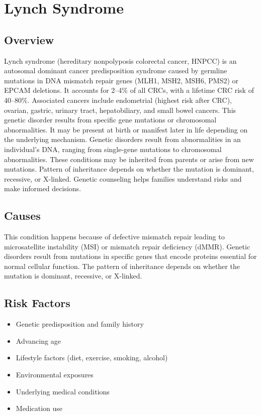 \chapter{Lynch Syndrome}
\label{sec:Lynch Syndrome}

\section{Overview}
Lynch syndrome (hereditary nonpolyposis colorectal cancer, HNPCC) is an autosomal dominant cancer predisposition syndrome caused by germline mutations in DNA mismatch repair genes (MLH1, MSH2, MSH6, PMS2) or EPCAM deletions. It accounts for 2--4\% of all CRCs, with a lifetime CRC risk of 40--80\%. Associated cancers include endometrial (highest risk after CRC), ovarian, gastric, urinary tract, hepatobiliary, and small bowel cancers. This genetic disorder results from specific gene mutations or chromosomal abnormalities. It may be present at birth or manifest later in life depending on the underlying mechanism. Genetic disorders result from abnormalities in an individual's DNA, ranging from single-gene mutations to chromosomal abnormalities. These conditions may be inherited from parents or arise from new mutations. Pattern of inheritance depends on whether the mutation is dominant, recessive, or X-linked. Genetic counseling helps families understand risks and make informed decisions.
\section{Causes}
This condition happens because of defective mismatch repair leading to microsatellite instability (MSI) or mismatch repair deficiency (dMMR). Genetic disorders result from mutations in specific genes that encode proteins essential for normal cellular function. The pattern of inheritance depends on whether the mutation is dominant, recessive, or X-linked.   
\section{Risk Factors}

\begin{itemize}[noitemsep]
  \item Genetic predisposition and family history
  \item Advancing age
  \item Lifestyle factors (diet, exercise, smoking, alcohol)
  \item Environmental exposures
  \item Underlying medical conditions
  \item Medication use
\end{itemize}
